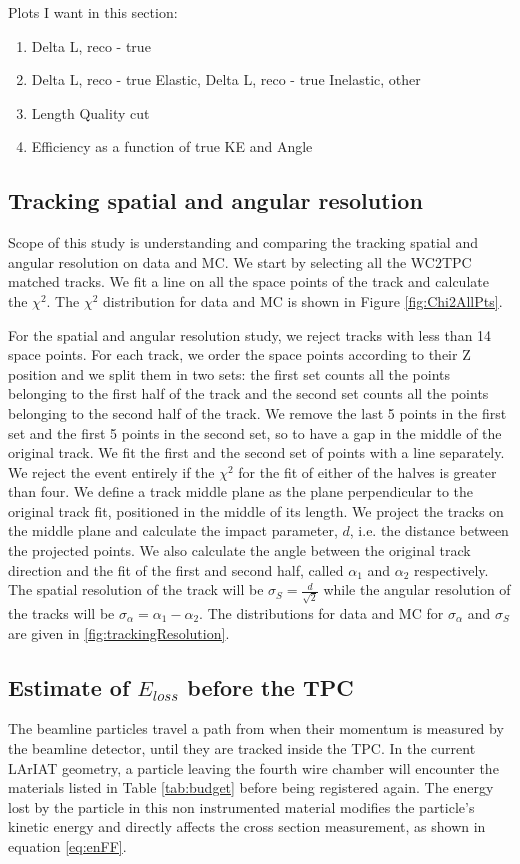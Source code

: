 Plots I want in this section:
\begin{enumerate}
\item Delta L, reco - true
\item Delta L, reco - true Elastic, Delta L, reco - true Inelastic, other
\item Length Quality cut
\item Efficiency as a function of true KE and Angle
\end{enumerate}


\subsection{Tracking spatial and angular resolution}
Scope of this study is understanding and comparing the tracking spatial and angular resolution on data and MC.
We start by selecting all the WC2TPC matched tracks. 
We fit a line on all the space points of the track and calculate the $\chi^2$. The $\chi^2$ distribution for data and MC is shown in Figure \ref{fig:Chi2AllPts}.

For the spatial and angular resolution study, we reject tracks with less than 14 space points. For each track, we order the space points according to their Z position and we split them in two sets: the first set counts all the points belonging to the first half of the track and the second set counts all the points belonging to the second half of the track. We remove the last 5 points in the first set and the first 5 points in the second set, so to have a gap in the middle of the original track. We fit the first and the second set of points with a line separately. We reject the event entirely if the  $\chi^2$ for the fit of either of the halves is greater than four.  We define a track middle plane as the plane perpendicular to the original track fit, positioned in the middle of its length. We project the tracks on the middle plane and calculate the impact parameter, $d$, i.e. the distance between the projected points. We also calculate the angle between the original track direction and the fit of the first and second half, called $\alpha_1$ and $\alpha_2$ respectively. The spatial resolution of the track will be $\sigma_S = \frac{d}{\sqrt 2}$ while the angular resolution of the tracks will be  $\sigma_\alpha = \alpha_1 - \alpha_2$. The distributions for data and MC for $\sigma_\alpha$ and $\sigma_S$ are given in \ref{fig:trackingResolution}.


\subsection{Estimate of $E_{loss}$ before the TPC}
The beamline particles travel a path from when their momentum is measured by the beamline detector, until they are tracked inside the TPC. In the current LArIAT geometry, a particle leaving the fourth wire chamber will encounter the materials listed in Table \ref{tab:budget} before being registered again. The energy lost by the particle in this non instrumented material modifies the particle's kinetic energy and directly affects the cross section measurement, as shown in equation \ref{eq:enFF}.

